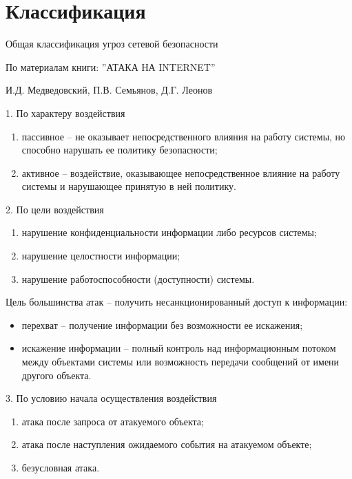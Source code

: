 \section{Классификация}
\begin{frame}{}
	\huge
	\center
	Общая классификация угроз сетевой безопасности

	\bigskip
	\normalsize
	По материалам книги: ''АТАКА НА INTERNET''

	И.Д. Медведовский, П.В. Семьянов, Д.Г. Леонов

\end{frame}


\begin{frame}{1. По характеру воздействия}
	\begin{enumerate}
		\item пассивное -- не оказывает непосредственного влияния на работу системы,  но способно нарушать ее политику безопасности;
		\item активное -- воздействие,  оказывающее непосредственное влияние на работу системы и нарушающее принятую в ней политику.
	\end{enumerate}
\end{frame}


\begin{frame}{2. По цели воздействия}
	\begin{enumerate}
		\item нарушение конфиденциальности информации либо ресурсов системы;
		\item нарушение целостности информации;
		\item нарушение работоспособности (доступности) системы. 
	\end{enumerate}
	\bigskip
	Цель большинства атак -- получить несанкционированный доступ к информации:
	\begin{itemize}
		\item перехват -- получение информации без возможности ее искажения;
		\item искажение информации -- полный контроль над информационным потоком между объектами системы или возможность передачи сообщений от имени другого объекта.
	\end{itemize}
\end{frame}


\begin{frame}{3. По условию начала осуществления воздействия}
	\begin{enumerate}
		\item атака после запроса от атакуемого объекта;
		\item атака после наступления ожидаемого события на атакуемом объекте;
		\item безусловная атака. 
	\end{enumerate}
\end{frame}


